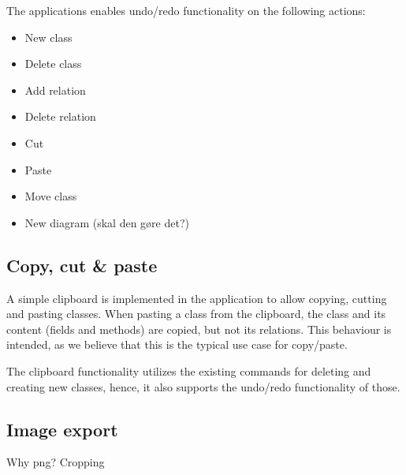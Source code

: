 The applications enables undo/redo functionality on the following actions:


\begin{itemize}
	\item New class
	\item Delete class
	\item Add relation
	\item Delete relation
	\item Cut
	\item Paste
	\item Move class
	\item New diagram (skal den gøre det?)
\end{itemize}


\subsection{Copy, cut \& paste}
A simple clipboard is implemented in the application to allow copying, cutting and pasting classes. When pasting a class from the clipboard, the class and its content (fields and methods) are copied, but not its relations. This behaviour is intended, as we believe that this is the typical use case for copy/paste.

The clipboard functionality utilizes the existing commands for deleting and creating new classes, hence, it also supports the undo/redo functionality of those.


\subsection{Image export}
Why png? Cropping

